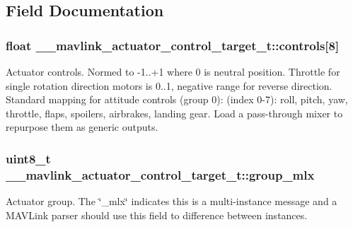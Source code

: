 \subsection{Field Documentation}
\hypertarget{struct____mavlink__actuator__control__target__t_a2fab71cddada32b7f1d23d5afec2b8b3}{
\subsubsection[{controls}]{\setlength{\rightskip}{0pt plus 5cm}float \+\_\+\+\_\+mavlink\+\_\+actuator\+\_\+control\+\_\+target\+\_\+t\+::controls\mbox{[}8\mbox{]}}}\label{struct____mavlink__actuator__control__target__t_a2fab71cddada32b7f1d23d5afec2b8b3}


Actuator controls. Normed to -\/1..+1 where 0 is neutral position. Throttle for single rotation direction motors is 0..1, negative range for reverse direction. Standard mapping for attitude controls (group 0)\+: (index 0-\/7)\+: roll, pitch, yaw, throttle, flaps, spoilers, airbrakes, landing gear. Load a pass-\/through mixer to repurpose them as generic outputs. 

\hypertarget{struct____mavlink__actuator__control__target__t_a2f43180f864758575cea6d59d23ab6c8}{
\subsubsection[{group\+\_\+mlx}]{\setlength{\rightskip}{0pt plus 5cm}uint8\+\_\+t \+\_\+\+\_\+mavlink\+\_\+actuator\+\_\+control\+\_\+target\+\_\+t\+::group\+\_\+mlx}}\label{struct____mavlink__actuator__control__target__t_a2f43180f864758575cea6d59d23ab6c8}


Actuator group. The \char`\"{}\+\_\+mlx\char`\"{} indicates this is a multi-\/instance message and a M\+A\+V\+Link parser should use this field to difference between instances. 

